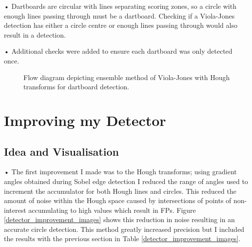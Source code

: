 \documentclass[11pt]{article}
\begin{document}
\noindent • Dartboards are circular with lines separating scoring zones, so a circle with enough lines passing through must be a dartboard. Checking if a Viola-Jones detection has either a circle centre or enough lines passing through would also result in a detection.


\noindent • Additional checks were added to ensure each dartboard was only detected once. 

\begin{figure}[b]
\centering
{}
\caption{Flow diagram depicting ensemble method of Viola-Jones with Hough transforms for dartboard detection.}
\label{detection_pipeline}
\end{figure}

\newpage

\section{Improving my Detector}
\label{detector_improvements}

\subsection{Idea and Visualisation}
\label{idea_vis}


• The first improvement I made was to the Hough transforms; using gradient angles obtained during Sobel edge detection I reduced the range of angles used to increment the accumulator for both Hough lines and circles. This reduced the amount of noise within the Hough space caused by intersections of points of non-interest accumulating to high values which result in FPs. Figure \ref{detector_improvement_images} shows this reduction in noise resulting in an accurate circle detection. This method greatly increased precision but I included the results with the previous section in Table \ref{detector_improvement_images}.
\end{document}
